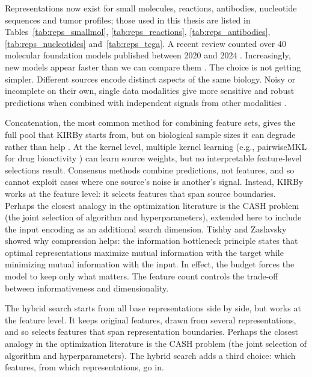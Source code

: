 Representations now exist for small molecules, reactions, antibodies, nucleotide sequences and tumor profiles; those used in this thesis are listed in Tables~\ref{tab:reps_smallmol}, \ref{tab:reps_reactions}, \ref{tab:reps_antibodies}, \ref{tab:reps_nucleotides} and~\ref{tab:reps_tcga}. A recent review counted over 40 molecular foundation models published between 2020 and 2024 \citep{Song2026}. Increasingly, new models appear faster than we can compare them \citep{Bommasani2021}. The choice is not getting simpler. Different sources encode distinct aspects of the same biology. Noisy or incomplete on their own, single data modalities give more sensitive and robust predictions when combined with independent signals from other modalities \citep{Steyaert2023}.

Concatenation, the most common method for combining feature sets, gives the full pool that KIRBy starts from, but on biological sample sizes it can degrade rather than help \citep{Bellman1961, Stahlschmidt2022}. At the kernel level, multiple kernel learning \citep{Gonen2011} (e.g., pairwiseMKL for drug bioactivity \citep{Cichonska2018}) can learn source weights, but no interpretable feature-level selections result. Consensus methods \citep{Valsecchi2020} combine predictions, not features, and so cannot exploit cases where one source's noise is another's signal. Instead, KIRBy works at the feature level: it selects features that span source boundaries. Perhaps the closest analogy in the optimization literature is the CASH problem \citep{Thornton2013} (the joint selection of algorithm and hyperparameters), extended here to include the input encoding as an additional search dimension. Tishby and Zaslavsky \citep{Tishby2015} showed why compression helps: the information bottleneck principle states that optimal representations maximize mutual information with the target while minimizing mutual information with the input. In effect, the budget forces the model to keep only what matters. The feature count controls the trade-off between informativeness and dimensionality.

The hybrid search starts from all base representations side by side, but works at the feature level. It keeps original features, drawn from several representations, and so selects features that span representation boundaries. Perhaps the closest analogy in the optimization literature is the CASH problem \citep{Thornton2013} (the joint selection of algorithm and hyperparameters). The hybrid search adds a third choice: which features, from which representations, go in.

